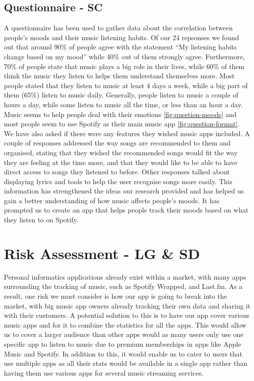 \documentclass[10pt]{report}
\begin{document}
\section{Questionnaire - SC}
\label{res:quest}
A questionnaire has been used to gather data about the correlation between people’s moods and their music listening habits. Of our 24 repsonses we found out that around 90\% of people agree with the statement “My listening habits change based on my mood” while 40\% out of them strongly agree. Furthermore, 70\% of people state that music plays a big role in their lives, while 60\% of them think the music they listen to helps them understand themselves more. Most people stated that they listen to music at least 4 days a week, while a big part of them (65\%) listen to music daily. Generally, people listen to music a couple of hours a day, while some listen to music all the time, or less than an hour a day. Music seems to help people deal with their emotions \ref{fig:question-moods} and most people seem to use Spotify as their main music app \ref{fig:question-format}. We have also asked if there were any features they wished music apps included. A couple of responses addressed the way songs are recommended to them and organised, stating that they wished the recommended songs would fit the way they are feeling at the time more, and that they would like to be able to have direct access to songs they listened to before. Other responses talked about displaying lyrics and tools to help the user recognise songs more easily. This information has strengthened the ideas our research provided and has helped us gain a better understanding of how music affects people’s moods. It has prompted us to create an app that helps people track their moods based on what they listen to on Spotify.

\chapter{Risk Assessment - LG \& SD}
Personal informatics applications already exist within a market, with many apps surrounding the tracking of music, such as Spotify Wrapped, and Last.fm. As a result, one risk we must consider is how our app is going to break into the market, with big music app owners already tracking their own data and sharing it with their customers. A potential solution to this is to have our app cover various music apps and for it to combine the statistics for all the apps. This would allow us to cover a larger audience than other apps would as many users only use one specific app to listen to music due to premium memberships in apps like Apple Music and Spotify. In addition to this, it would enable us to cater to users that use multiple apps as all their stats would be available in a single app rather than having them use various apps for several music streaming services.
\end{document}
